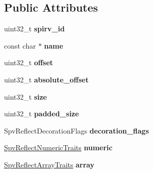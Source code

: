 \subsection*{Public Attributes}
\begin{DoxyCompactItemize}
\item 
\mbox{\label{structSpvReflectBlockVariable_acc713e06e4ea6793d259c025094e9c05}} 
uint32\+\_\+t {\bfseries spirv\+\_\+id}
\item 
\mbox{\label{structSpvReflectBlockVariable_a732a319e604f302f784b668d52005049}} 
const char $\ast$ {\bfseries name}
\item 
\mbox{\label{structSpvReflectBlockVariable_aec357ae4eb303e75b4e74e1a2fafd928}} 
uint32\+\_\+t {\bfseries offset}
\item 
\mbox{\label{structSpvReflectBlockVariable_ab5f772748e157c3621afe1898c78c3d7}} 
uint32\+\_\+t {\bfseries absolute\+\_\+offset}
\item 
\mbox{\label{structSpvReflectBlockVariable_a12c7e69e5afba70827e2329ed4d9a68b}} 
uint32\+\_\+t {\bfseries size}
\item 
\mbox{\label{structSpvReflectBlockVariable_ac1a33a4537d5fc3476a1ace4ef06b5c4}} 
uint32\+\_\+t {\bfseries padded\+\_\+size}
\item 
\mbox{\label{structSpvReflectBlockVariable_ad16fcd1f91cc18294037faa71460cf97}} 
Spv\+Reflect\+Decoration\+Flags {\bfseries decoration\+\_\+flags}
\item 
\mbox{\label{structSpvReflectBlockVariable_a6fa40973b8c6750dcc291100ff8348c8}} 
\hyperlink{structSpvReflectNumericTraits}{Spv\+Reflect\+Numeric\+Traits} {\bfseries numeric}
\item 
\mbox{\label{structSpvReflectBlockVariable_af4ae8b0b9c4cd1395c7758c50fa5454e}} 
\hyperlink{structSpvReflectArrayTraits}{Spv\+Reflect\+Array\+Traits} {\bfseries array}
\item 

\end{DoxyCompactItemize}
